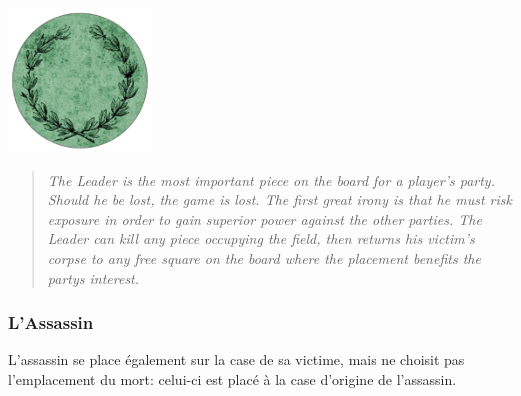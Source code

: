 \documentclass{article}
\begin{document}
\vspace{10pt} %
\noindent %
\begin{minipage}{0.3\textwidth} %
\includegraphics[width=1.5in,height=1.5in]{media/image13.png}
\end{minipage}%
\hfill %
\begin{minipage}{0.75\textwidth} %

\begin{quote}


\textit{The Leader is the most important piece on the board for a player's
party. Should he be lost, the game is lost. The first great irony is
that he must risk exposure in order to gain superior power against the
other parties.
The Leader can kill any piece occupying the field, then returns his
victim's corpse to any free square on the board where the
placement benefits the party\textquotesingle s interest.
}
\end{quote}
\end{minipage}
\vspace{20pt} %


\newpage


\subsubsection{L'Assassin}
L'assassin se place également sur la case de sa victime, mais ne choisit pas l'emplacement du mort: celui-ci est placé à la case d'origine de l'assassin.
\end{document}
